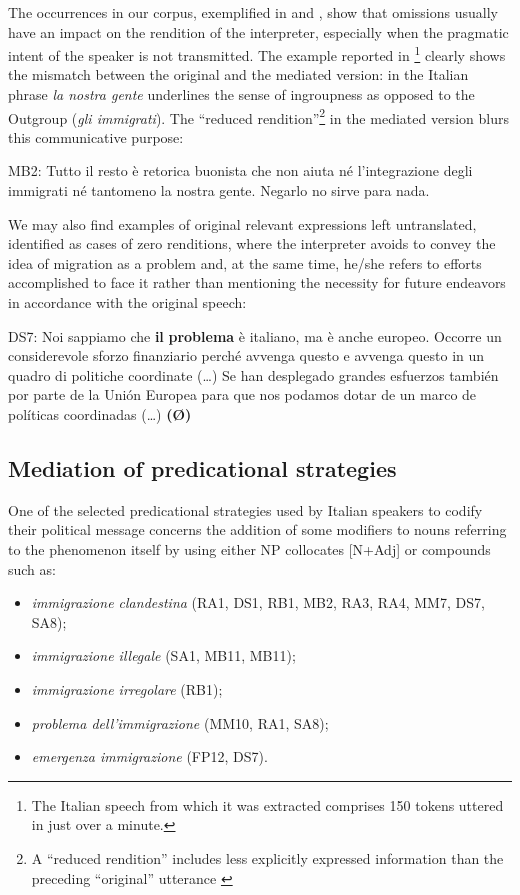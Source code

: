 \documentclass[output=paper]{langscibook}
\begin{document}
The occurrences in our corpus, exemplified in  and , show that omissions usually have an impact on the rendition of the interpreter, especially when the pragmatic intent of the speaker is not transmitted. The example reported in \footnote{The Italian speech from which it was extracted comprises 150 tokens uttered in just over a minute.} clearly shows the mismatch between the original and the mediated version: in the Italian phrase \textit{la nostra gente} underlines the sense of ingroupness as opposed to the Outgroup (\textit{gli immigrati}). The “reduced rendition”\footnote{A “reduced rendition” includes less explicitly expressed information than the preceding “original” utterance \citep[107]{Wadensjoe1998}} in the mediated version blurs this communicative purpose:

\ea\label{ex:mori:8}
\ea
MB2: Tutto il resto è retorica buonista che non aiuta né l'integrazione degli immigrati né tantomeno la nostra gente.
\ex
Negarlo no sirve para nada.
\z
\z

We may also find examples of original relevant expressions left untranslated, identified as cases of zero renditions, where the interpreter avoids to convey the idea of migration as a problem  and, at the same time, he/she refers to efforts accomplished to face it rather than mentioning the necessity for future endeavors in accordance with the original speech:

\ea\label{ex:mori:9}
\ea
DS7: Noi sappiamo che \textbf{il} \textbf{problema} è italiano, ma è anche europeo. Occorre un considerevole sforzo finanziario perché avvenga questo e avvenga questo in un quadro di politiche coordinate (\ldots)
\ex
Se han desplegado grandes esfuerzos también por parte de la Unión Europea para que nos podamos dotar de un marco de políticas coordinadas (\ldots) \textbf{(Ø)}
\z
\z


\subsection{Mediation of predicational strategies}\label{sec:mori:4.2}

One of the selected predicational strategies used by Italian speakers to codify their political message concerns the addition of some modifiers to nouns referring to the phenomenon itself by using either NP collocates [N+Adj] or compounds such as: 

\begin{itemize}
\item
\textit{immigrazione clandestina} (RA1, DS1, RB1, MB2, RA3, RA4, MM7, DS7, SA8);
\item
\textit{immigrazione illegale} (SA1, MB11, MB11); 
\item
\textit{immigrazione irregolare} (RB1); 
\item
\textit{problema dell’immigrazione} (MM10, RA1, SA8); 
\item
\textit{emergenza immigrazione} (FP12, DS7).
\end{itemize}
\end{document}
